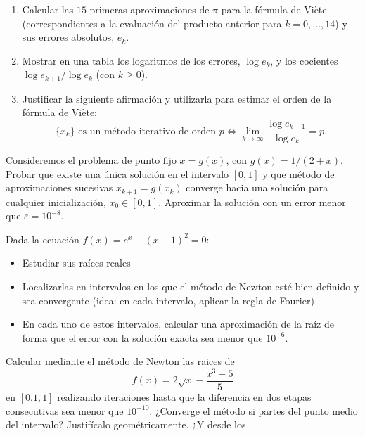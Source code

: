 \begin{problemas}
\begin{problema}
    \begin{enumerate}
    \item Calcular las $15$ primeras aproximaciones de $\pi$ para la
      fórmula de Viète (correspondientes a la evaluación del producto
      anterior para $k=0,...,14$) y sus errores absolutos, $e_k$.
    \item Mostrar en una tabla los logaritmos de los errores, $\log
      e_k$, y los cocientes $\log e_{k+1}/\log
      e_{k}$ (con $k\ge 0$).
    \item Justificar la siguiente afirmación y utilizarla para estimar
      el orden de la fórmula de Viète:
      \begin{equation*}
        \label{eq:1}
        \{x_k\} \text{ es un método iterativo de orden } p
        \Leftrightarrow \lim_{k\to\infty} \frac{\log e_{k+1}}{\log e_{k}}=p.
      \end{equation*}
    \end{enumerate}
  \end{problema}
  \begin{problema}
    Consideremos el problema de punto fijo $x=g(x)$, con
    $g(x)=1/(2+x)$.  Probar que existe una única solución en el
    intervalo $[0,1]$ y que método de aproximaciones sucesivas
    $x_{k+1}=g(x_k)$ converge hacia una solución para cualquier
    inicialización, $x_0\in[0,1]$. Aproximar la
    solución con un error menor que $\varepsilon=10^{-8}$.
  \end{problema}
  \begin{problema}
    Dada la ecuación $f(x)=e^x-(x+1)^2=0$:
    \begin{itemize}
    \item Estudiar sus raíces reales
    \item Localizarlas en intervalos en los que el método de Newton
      esté bien definido y sea convergente (idea: en cada intervalo,
      aplicar la regla de Fourier)
    \item En cada uno de estos intervalos, calcular una aproximación
      de la raíz de forma que el error con la solución exacta sea
      menor que $10^{-6}$.
    \end{itemize}
  \end{problema}
  \begin{problema}
    Calcular mediante el método de Newton las raices de
    $$f(x)=2\sqrt{x}-\frac{x^3+5}{5}$$ en $[0.1,1]$ realizando
    iteraciones hasta que la diferencia en dos etapas consecutivas sea
    menor que $10^{-10}$. ¿Converge el método si partes del punto
    medio del intervalo? Justifícalo geométricamente. ¿Y desde los

\end{problema}
\end{problemas}
